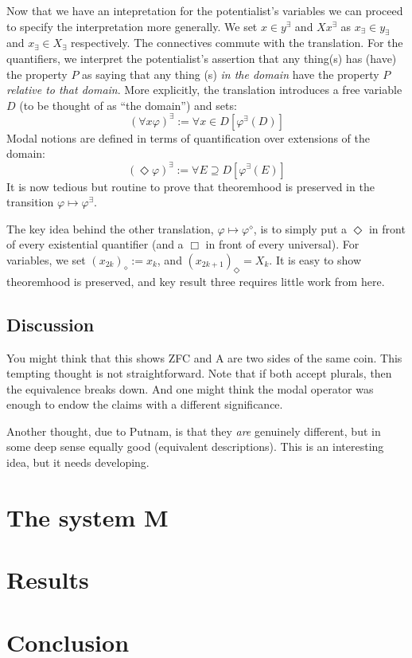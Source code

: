 \documentclass{article}
\begin{document}
Now that we have an intepretation for the potentialist's variables we can proceed to specify 
the interpretation more generally. We set $x \in y^\exists$ and $Xx^\exists$ as $x_\exists \in y_\exists$ 
and $x_\exists \in X_\exists$ respectively. The connectives commute with the translation. For the quantifiers,
we interpret the potentialist's assertion that any thing(s) has (have) the property $P$ as saying 
that any thing (s) \emph{in the domain} have the property $P$ \emph{relative to that domain}. More explicitly, 
the translation introduces a free variable $D$ (to be thought of as ``the domain'') and sets:
\[(\forall x \varphi)^\exists := \forall x \in D [\varphi^\exists(D)]\]
Modal notions are defined in terms of quantification over extensions of the domain:
\[ (\Diamond \varphi)^\exists := \forall E \supseteq D [\varphi^\exists(E)]\]
It is now tedious but routine to prove that theoremhood is preserved 
in the transition $\varphi \mapsto \varphi^\exists$.

The key idea behind the other translation, $\varphi \mapsto \varphi^\diamond$, 
is to simply put a $\Diamond$ in front of every existential quantifier (and a $\Box$ in front of 
every universal). For variables, we set $(x_{2k})_\diamond := x_k$, and $(x_{2k+1})_\Diamond = X_k$.
It is easy to show theoremhood is preserved, and key result three requires little work from here.

\subsection{Discussion}
You might think that this shows ZFC and A are two sides of the same coin. 
This tempting thought is not straightforward. 
Note that if both accept plurals, then the equivalence breaks down. 
And one might think the modal operator was enough to endow the claims with a different significance.

Another thought, due to Putnam, is that they \emph{are} genuinely different, but in 
some deep sense equally good (equivalent descriptions). This is an interesting idea, but 
it needs developing.
\section{The system M}
\section{Results}
\section{Conclusion}
\end{document}
